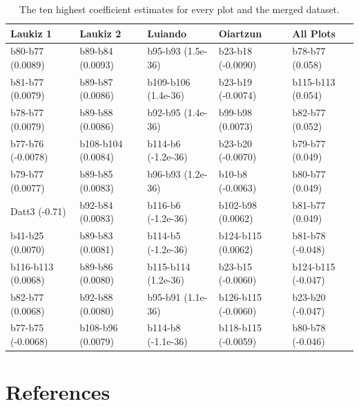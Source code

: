 \documentclass[review]{elsarticle}
\begin{document}
\begin{table}[b!]
\centering
\caption[t]{The ten highest coefficient estimates for every plot and the merged dataset.}
\begingroup\footnotesize
\begin{tabular}{lllll}
	\\
	Laukiz 1           & Laukiz 2           & Luiando             & Oiartzun            & All Plots          \\
	\hline
	b80-b77 (0.0089)   & b89-b84 (0.0093)   & b95-b93 (1.5e-36)   & b23-b18 (-0.0090)   & b78-b77 (0.058)    \\
	b81-b77 (0.0079)   & b89-b87 (0.0086)   & b109-b106 (1.4e-36) & b23-b19 (-0.0074)   & b115-b113 (0.054)  \\
	b78-b77 (0.0079)   & b89-b88 (0.0086)   & b92-b95 (1.4e-36)   & b99-b98 (0.0073)    & b82-b77 (0.052)    \\
	b77-b76 (-0.0078)  & b108-b104 (0.0084) & b114-b6 (-1.2e-36)  & b23-b20 (-0.0070)   & b79-b77 (0.049)    \\
	b79-b77 (0.0077)   & b89-b85 (0.0083)   & b96-b93 (1.2e-36)   & b10-b8 (-0.0063)    & b80-b77 (0.049)    \\
	Datt3 (-0.71)      & b92-b84 (0.0083)   & b116-b6 (-1.2e-36)  & b102-b98 (0.0062)   & b81-b77 (0.049)    \\
	b41-b25 (0.0070)   & b89-b83 (0.0081)   & b114-b5 (-1.2e-36)  & b124-b115 (0.0062)  & b81-b78 (-0.048)   \\
	b116-b113 (0.0068) & b89-b86 (0.0080)   & b115-b114 (1.2e-36) & b23-b15 (-0.0060)   & b124-b115 (-0.047) \\
	b82-b77 (0.0068)   & b92-b88 (0.0080)   & b95-b91 (1.1e-36)   & b126-b115 (-0.0060) & b23-b20 (-0.047)   \\
	b77-b75 (-0.0068)  & b108-b96 (0.0079)  & b114-b8 (-1.1e-36)  & b118-b115 (-0.0059) & b80-b78 (-0.046)   \\
	\bottomrule
\end{tabular}
\endgroup
\label{tab:variable-importance}
\end{table}

\section*{References}


\end{document}
